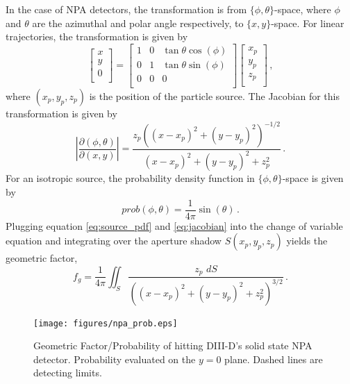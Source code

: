 In the case of NPA detectors, the transformation is from $\{\phi,\theta\}$-space, where $\phi$ and $\theta$ are the azimuthal and polar angle respectively, to $\{x,y\}$-space. For linear trajectories, the transformation is given by
\begin{equation}
\label{eq:matrix_transform}
\begin{bmatrix}
	x \\
	y \\
	0 \\
\end{bmatrix}
=
\begin{bmatrix}
	1 & 0 & \tan{\theta}\cos(\phi)\\
	0 & 1 & \tan{\theta}\sin(\phi)\\
	0 & 0 & 0\\
\end{bmatrix}
\begin{bmatrix}
	x_p \\
	y_p \\
	z_p \\
\end{bmatrix}\,,
\end{equation}
where $(x_p,y_p,z_p)$ is the position of the particle source. The Jacobian for this transformation is given by
\begin{equation}
\label{eq:jacobian}
\left | \frac{\partial(\phi,\theta)}{\partial(x,y)} \right| = \frac{z_p ((x-x_p)^2 + (y-y_p)^2)^{-1/2}}{(x-x_p)^2 + (y-y_p)^2 + z_p^2}\,.
\end{equation}
For an isotropic source, the probability density function in $\{\phi,\theta\}$-space is given by 
\begin{equation}
\label{eq:source_pdf}
prob(\phi,\theta) = \frac{1}{4\pi} \sin(\theta)\,.
\end{equation}
Plugging equation \ref{eq:source_pdf} and \ref{eq:jacobian} into the change of variable equation and integrating over the aperture shadow $S(x_p,y_p,z_p)$ yields the geometric factor,
\begin{equation}
\label{eq:prob_geo}
f_g = \frac{1}{4\pi}\iint_S\frac{z_p\,\, dS}{((x-x_p)^2 + (y-y_p)^2 + z_p^2)^{3/2}}\,.
\end{equation}
\begin{figure}[h!]
    \centering
    \texttt{[image: figures/npa\_prob.eps]}
    \caption{Geometric Factor/Probability of hitting DIII-D's solid state NPA detector. Probability evaluated on the $y=0$ plane. Dashed lines are detecting limits.}
    \label{fig:npa_prob}
\end{figure}

